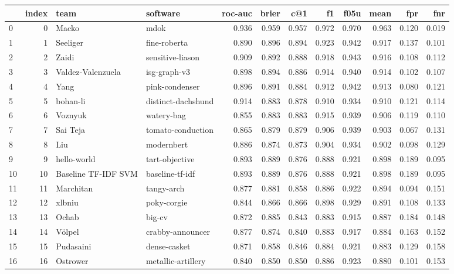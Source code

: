 \begin{tabular}{lrllrrrrrrrr}
\toprule
 & index & team & software & roc-auc & brier & c@1 & f1 & f05u & mean & fpr & fnr \\
\midrule
0 & 0 & Macko & mdok & 0.936 & 0.959 & 0.957 & 0.972 & 0.970 & 0.963 & 0.120 & 0.019 \\
1 & 1 & Seeliger & fine-roberta & 0.890 & 0.896 & 0.894 & 0.923 & 0.942 & 0.917 & 0.137 & 0.101 \\
2 & 2 & Zaidi & sensitive-liason & 0.909 & 0.892 & 0.888 & 0.918 & 0.943 & 0.916 & 0.108 & 0.112 \\
3 & 3 & Valdez-Valenzuela & isg-graph-v3 & 0.898 & 0.894 & 0.886 & 0.914 & 0.940 & 0.914 & 0.102 & 0.107 \\
4 & 4 & Yang & pink-condenser & 0.896 & 0.891 & 0.884 & 0.912 & 0.942 & 0.913 & 0.080 & 0.121 \\
5 & 5 & bohan-li & distinct-dachshund & 0.914 & 0.883 & 0.878 & 0.910 & 0.934 & 0.910 & 0.121 & 0.114 \\
6 & 6 & Voznyuk & watery-bag & 0.855 & 0.883 & 0.883 & 0.915 & 0.939 & 0.906 & 0.119 & 0.110 \\
7 & 7 & Sai Teja & tomato-conduction & 0.865 & 0.879 & 0.879 & 0.906 & 0.939 & 0.903 & 0.067 & 0.131 \\
8 & 8 & Liu & modernbert & 0.886 & 0.874 & 0.873 & 0.904 & 0.934 & 0.902 & 0.098 & 0.129 \\
9 & 9 & hello-world & tart-objective & 0.893 & 0.889 & 0.876 & 0.888 & 0.921 & 0.898 & 0.189 & 0.095 \\
10 & 10 & Baseline TF-IDF SVM & baseline-tf-idf & 0.893 & 0.889 & 0.876 & 0.888 & 0.921 & 0.898 & 0.189 & 0.095 \\
11 & 11 & Marchitan & tangy-arch & 0.877 & 0.881 & 0.858 & 0.886 & 0.922 & 0.894 & 0.094 & 0.151 \\
12 & 12 & xlbniu & poky-corgie & 0.844 & 0.866 & 0.866 & 0.898 & 0.929 & 0.891 & 0.108 & 0.133 \\
13 & 13 & Ochab & big-cv & 0.872 & 0.885 & 0.843 & 0.883 & 0.915 & 0.887 & 0.184 & 0.148 \\
14 & 14 & Völpel & crabby-announcer & 0.877 & 0.874 & 0.840 & 0.883 & 0.917 & 0.884 & 0.163 & 0.152 \\
15 & 15 & Pudasaini & dense-casket & 0.871 & 0.858 & 0.846 & 0.884 & 0.921 & 0.883 & 0.129 & 0.158 \\
16 & 16 & Ostrower & metallic-artillery & 0.840 & 0.850 & 0.850 & 0.886 & 0.923 & 0.880 & 0.101 & 0.153 \\

\end{tabular}
